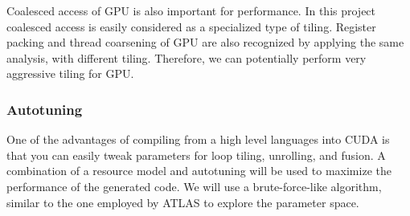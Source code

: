 Coalesced access of GPU is also important for performance. In this
project coalesced access is easily considered as a specialized type of
tiling. Register packing and thread coarsening of GPU are also
recognized by applying the same analysis, with different tiling.
Therefore, we can potentially perform very aggressive tiling for GPU.

\subsubsection{Autotuning}\label{autotuning}

One of the advantages of compiling from a high level languages into CUDA
is that you can easily tweak parameters for loop tiling, unrolling, and
fusion. A combination of a resource model and autotuning will be used to
maximize the performance of the generated code. We will use a brute-force-like
algorithm, similar to the one employed by ATLAS\cite{atlas} to explore the
parameter space.
